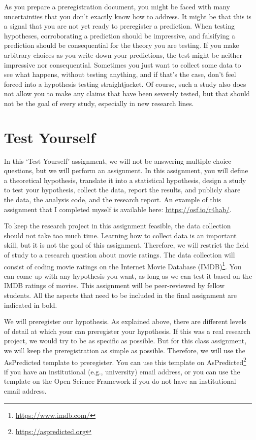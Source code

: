 \documentclass[
  oneside]{krantz}
\renewcommand{\href}[2]{#2\footnote{\url{#1}}}
\begin{document}
As you prepare a preregistration document, you might be faced with many uncertainties that you don't exactly know how to address. It might be that this is a signal that you are not yet ready to preregister a prediction. When testing hypotheses, corroborating a prediction should be impressive, and falsifying a prediction should be consequential for the theory you are testing. If you make arbitrary choices as you write down your predictions, the test might be neither impressive nor consequential. Sometimes you just want to collect some data to see what happens, without testing anything, and if that's the case, don't feel forced into a hypothesis testing straightjacket. Of course, such a study also does not allow you to make any claims that have been severely tested, but that should not be the goal of every study, especially in new research lines.

\hypertarget{test-yourself-11}{%
\section{Test Yourself}\label{test-yourself-11}}

In this `Test Yourself' assignment, we will not be answering multiple choice questions, but we will perform an assignment. In this assignment, you will define a theoretical hypothesis, translate it into a statistical hypothesis, design a study to test your hypothesis, collect the data, report the results, and publicly share the data, the analysis code, and the research report. An example of this assignment that I completed myself is available here: \url{https://osf.io/r4hab/}.

To keep the research project in this assignment feasible, the data collection should not take too much time. Learning how to collect data is an important skill, but it is not the goal of this assignment. Therefore, we will restrict the field of study to a research question about movie ratings. The data collection will consist of coding movie ratings on the \href{https://www.imdb.com/}{Internet Movie Database (IMDB)}. You can come up with any hypothesis you want, as long as we can test it based on the IMDB ratings of movies. This assignment will be peer-reviewed by fellow students. All the aspects that need to be included in the final assignment are indicated in bold.

We will preregister our hypothesis. As explained above, there are different levels of detail at which your can preregister your hypothesis. If this was a real research project, we would try to be as specific as possible. But for this class assignment, we will keep the preregistration as simple as possible. Therefore, we will use the AsPredicted template to preregister. You can use this template on \href{https://aspredicted.org}{AsPredicted} if you have an institutional (e.g., university) email address, or you can use the template on the Open Science Framework if you do not have an institutional email address.
\end{document}
